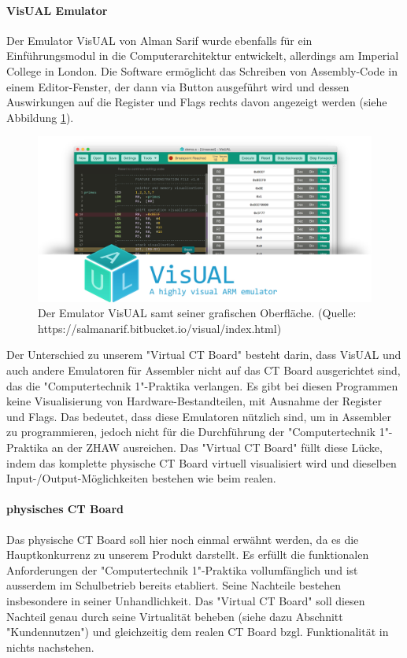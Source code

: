 \documentclass[10pt]{article}
\begin{document}
\paragraph{VisUAL Emulator}
Der Emulator VisUAL von Alman Sarif wurde ebenfalls für ein Einführungsmodul in die Computerarchitektur entwickelt, allerdings am Imperial College in London. Die Software ermöglicht das Schreiben von Assembly-Code in einem Editor-Fenster, der dann via Button ausgeführt wird und dessen Auswirkungen auf die Register und Flags rechts davon angezeigt werden (siehe Abbildung \ref{emulator}).
\begin{figure}[h]
\includegraphics[width=\textwidth]{visual_emulator}
\caption{Der Emulator VisUAL samt seiner grafischen Oberfläche. (Quelle: https://salmanarif.bitbucket.io/visual/index.html)}
\label{emulator}
\end{figure}
Der Unterschied zu unserem "Virtual CT Board" besteht darin, dass VisUAL und auch andere Emulatoren für Assembler nicht auf das CT Board ausgerichtet sind, das die "Computertechnik 1"-Praktika verlangen. Es gibt bei diesen Programmen keine Visualisierung von Hardware-Bestandteilen, mit Ausnahme der Register und Flags. Das bedeutet, dass diese Emulatoren nützlich sind, um in Assembler zu programmieren, jedoch nicht für die Durchführung der "Computertechnik 1"-Praktika an der ZHAW ausreichen. Das "Virtual CT Board" füllt diese Lücke, indem das komplette physische CT Board virtuell visualisiert wird und dieselben Input-/Output-Möglichkeiten bestehen wie beim realen.

\paragraph{physisches CT Board} 

Das physische CT Board soll hier noch einmal erwähnt werden, da es die Hauptkonkurrenz zu unserem Produkt darstellt. Es erfüllt die funktionalen Anforderungen der "Computertechnik 1"-Praktika vollumfänglich und ist ausserdem im Schulbetrieb bereits etabliert. Seine Nachteile bestehen insbesondere in seiner Unhandlichkeit. Das "Virtual CT Board" soll diesen Nachteil genau durch seine Virtualität beheben (siehe dazu Abschnitt "Kundennutzen") und gleichzeitig dem realen CT Board bzgl. Funktionalität in nichts nachstehen. 
\end{document}
